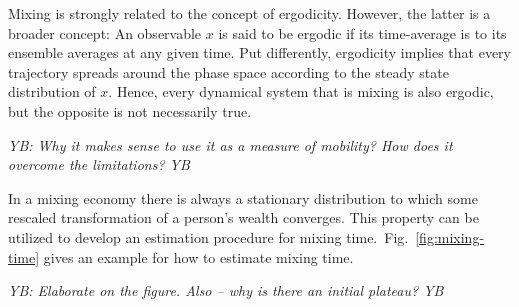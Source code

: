 \documentclass[11pt]{article}
\newcommand{\blue}[1]{{\color{blue} #1}}
\newcommand{\YB}[1]{\blue{{\it YB: #1 YB}}}
\newcommand{\fref}[1]{Fig.~\ref{fig:#1}}
\numberwithin{equation}{section}
\begin{document}
Mixing is strongly related to the concept of ergodicity. However, the latter is a broader concept: An observable $x$ is said to be ergodic if its time-average is to its ensemble averages at any given time. Put differently, ergodicity implies that every trajectory spreads around the phase space according to the steady state distribution of $x$. Hence, every dynamical system that is mixing is also ergodic, but the opposite is not necessarily true.

\YB{Why it makes sense to use it as a measure of mobility? How does it overcome the limitations?}

In a mixing economy there is always a stationary distribution to which some rescaled transformation of a person's wealth converges. This property can be utilized to develop an estimation procedure for mixing time.~\fref{mixing-time} gives an example for how to estimate mixing time.

\YB{Elaborate on the figure. Also -- why is there an initial plateau?}
\end{document}
